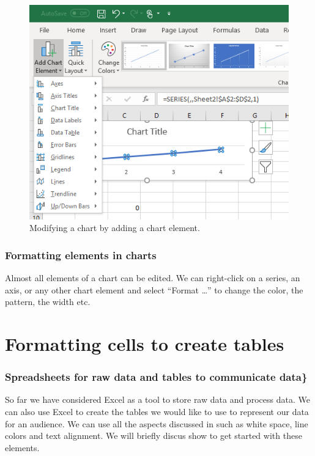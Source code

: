 \documentclass[]{book}
\begin{document}
\begin{figure}

{\centering \includegraphics[width=0.6\linewidth]{_resources/chapter_excelbasic/change2} 

}

\caption{Modifying a chart by adding a chart element.}\label{fig:ex30}
\end{figure}

\hypertarget{formatting-elements-in-charts}{%
\subsubsection*{Formatting elements in charts}\label{formatting-elements-in-charts}}

Almost all elements of a chart can be edited. We can right-click on a series, an axis, or any other chart element and select ``Format \ldots{}'' to change the color, the pattern, the width etc.

\hypertarget{formatting-cells-to-create-tables}{%
\section{Formatting cells to create tables}\label{formatting-cells-to-create-tables}}

\hypertarget{spreadsheets-for-raw-data-and-tables-to-communicate-data}{%
\subsubsection*{Spreadsheets for raw data and tables to communicate data\}}\label{spreadsheets-for-raw-data-and-tables-to-communicate-data}}

So far we have considered Excel as a tool to store raw data and process data. We can also use Excel to create the tables we would like to use to represent our data for an audience. We can use all the aspects discussed in \citet{few2012show} such as white space, line colors and text alignment. We will briefly discus show to get started with these elements.
\end{document}
